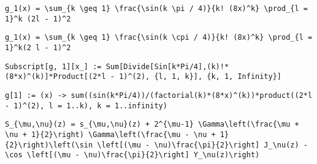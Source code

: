 \newsavebox\BZMA
\begin{lrbox}{\BZMA}
 \begin{minipage}[t]{0.82\textwidth}
  \lstinline[language={[latex]TeX},mathescape,breaklines=true]""
 \end{minipage}
\end{lrbox}
\newsavebox\CAT
\begin{lrbox}{\CAT}
 \begin{minipage}[t]{0.82\textwidth}
  \lstinline[language={[latex]TeX},mathescape,breaklines=true]"g_1(x) = \sum_{k \geq 1} \frac{\sin(k \pi / 4)}{k! (8x)^k} \prod_{l = 1}^k (2l - 1)^2"
 \end{minipage}
\end{lrbox}
\newsavebox\CAST
\begin{lrbox}{\CAST}
 \begin{minipage}[t]{0.82\textwidth}
  \lstinline[language={[latex]TeX},mathescape,breaklines=true]"g_1(x) = \sum_{k \geq 1} \frac{\sin(k \cpi / 4)}{k! (8x)^k} \prod_{l = 1}^k(2 l - 1)^2"
 \end{minipage}
\end{lrbox}
\newsavebox\CAMM
\begin{lrbox}{\CAMM}
 \begin{minipage}[t]{0.82\textwidth}
  \lstinline[language={[latex]TeX},mathescape,breaklines=true]"Subscript[g, 1][x_] := Sum[Divide[Sin[k*Pi/4],(k)!*(8*x)^(k)]*Product[(2*l - 1)^(2), {l, 1, k}], {k, 1, Infinity}]"
 \end{minipage}
\end{lrbox}
\newsavebox\CAMA
\begin{lrbox}{\CAMA}
 \begin{minipage}[t]{0.82\textwidth}
  \lstinline[language={[latex]TeX},mathescape,breaklines=true]"g[1] := (x) -> sum((sin(k*Pi/4))/(factorial(k)*(8*x)^(k))*product((2*l - 1)^(2), l = 1..k), k = 1..infinity)"
 \end{minipage}
\end{lrbox}
\newsavebox\CBT
\begin{lrbox}{\CBT}
 \begin{minipage}[t]{0.82\textwidth}
  \lstinline[language={[latex]TeX},mathescape,breaklines=true]"S_{\mu,\nu}(z) = s_{\mu,\nu}(z) + 2^{\mu-1} \Gamma\left(\frac{\mu + \nu + 1}{2}\right) \Gamma\left(\frac{\mu - \nu + 1}{2}\right)\left(\sin \left[(\mu - \nu)\frac{\pi}{2}\right] J_\nu(z) - \cos \left[(\mu - \nu)\frac{\pi}{2}\right] Y_\nu(z)\right)"
 \end{minipage}
\end{lrbox}
